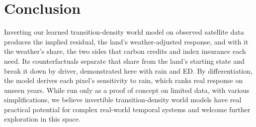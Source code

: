 \documentclass[letterpaper]{article} %
\begin{document}
\section{Conclusion}
Inverting our learned transition-density world model on observed satellite data produces the implied residual, the land's weather-adjusted response, and with it the weather's share, the two sides that carbon credits and index insurance each need. Its counterfactuals separate that share from the land's starting state and break it down by driver, demonstrated here with rain and ED. By differentiation, the model derives each pixel's sensitivity to rain, which ranks real response on unseen years. While run only as a proof of concept on limited data, with various simplifications, we believe invertible transition-density world models have real practical potential for complex real-world temporal systems and welcome further exploration in this space.


\end{document}
